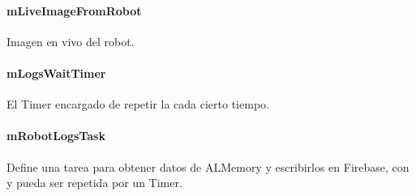 \paragraph{mLiveImageFromRobot}
\label{\detokenize{dev_docs:mliveimagefromrobot}}

\begin{fulllineitems}
\label{\detokenize{dev_docs:com.lar.cloudnao.RemoteControllerActivity.mLiveImageFromRobot}}
Imagen en vivo del robot.

\end{fulllineitems}



\paragraph{mLogsWaitTimer}
\label{\detokenize{dev_docs:mlogswaittimer}}

\begin{fulllineitems}
\label{\detokenize{dev_docs:com.lar.cloudnao.RemoteControllerActivity.mLogsWaitTimer}}
El Timer encargado de repetir la {\hyperref[\detokenize{dev_docs:com.lar.cloudnao.RemoteControllerActivity.mRobotLogsTask}]{}} cada cierto tiempo.

\end{fulllineitems}



\paragraph{mRobotLogsTask}
\label{\detokenize{dev_docs:mrobotlogstask}}

\begin{fulllineitems}
\label{\detokenize{dev_docs:com.lar.cloudnao.RemoteControllerActivity.mRobotLogsTask}}
Define una tarea para obtener datos de ALMemory y escribirlos en Firebase, con  y pueda ser repetida por un Timer.

\end{fulllineitems}



